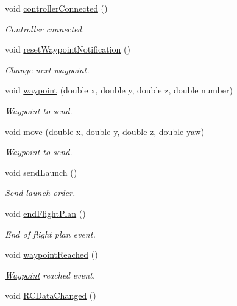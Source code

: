 \begin{DoxyCompactItemize}
void \hyperlink{class_mission_control_ae81ae21c32c5ea9503d5839007c0ceba}{controller\-Connected} ()
\begin{DoxyCompactList}\small\item\em Controller connected. \end{DoxyCompactList}\item 
void \hyperlink{class_mission_control_a5c90037ed557c1bdf5e614699adb96f1}{reset\-Waypoint\-Notification} ()
\begin{DoxyCompactList}\small\item\em Change next waypoint. \end{DoxyCompactList}\item 
void \hyperlink{class_mission_control_aef949ad1188cd7456563d962b92c8e5e}{waypoint} (double x, double y, double z, double number)
\begin{DoxyCompactList}\small\item\em \hyperlink{class_waypoint}{Waypoint} to send. \end{DoxyCompactList}\item 
void \hyperlink{class_mission_control_abfd08de26b16ad3d1caba0f909f4e762}{move} (double x, double y, double z, double yaw)
\begin{DoxyCompactList}\small\item\em \hyperlink{class_waypoint}{Waypoint} to send. \end{DoxyCompactList}\item 
void \hyperlink{class_mission_control_a53fe2acf076954aeada9d17f1b15277b}{send\-Launch} ()
\begin{DoxyCompactList}\small\item\em Send launch order. \end{DoxyCompactList}\item 
void \hyperlink{class_mission_control_ab0cae1ab8edfea63ec3d544844f5de9d}{end\-Flight\-Plan} ()
\begin{DoxyCompactList}\small\item\em End of flight plan event. \end{DoxyCompactList}\item 
void \hyperlink{class_mission_control_a43e66058b622a22cf00a63f5f7490b59}{waypoint\-Reached} ()
\begin{DoxyCompactList}\small\item\em \hyperlink{class_waypoint}{Waypoint} reached event. \end{DoxyCompactList}\item 
void \hyperlink{class_mission_control_a2aaf1f875b92d024028e134729ae6b30}{R\-C\-Data\-Changed} ()

\end{DoxyCompactItemize}
